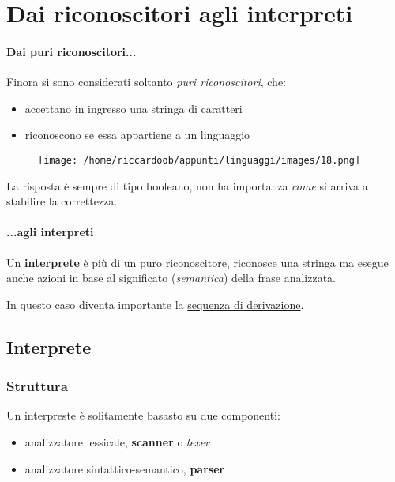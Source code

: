 \chapter{Dai riconoscitori agli interpreti}

\subsubsection{Dai puri riconoscitori...}
Finora si sono considerati soltanto \textit{puri riconoscitori}, che:
\begin{itemize}
    \item accettano in ingresso una stringa di caratteri
    \item riconoscono se essa appartiene a un linguaggio
\end{itemize}

\begin{figure}[H]
    \centering
    \texttt{[image: /home/riccardoob/appunti/linguaggi/images/18.png]}
\end{figure}

La risposta è sempre di tipo booleano, non ha importanza \textit{come} si arriva a stabilire la correttezza.

\subsubsection{...agli interpreti}
Un \textbf{interprete} è più di un puro riconoscitore, riconosce una stringa ma esegue anche azioni in base al significato (\textit{semantica}) della frase analizzata.

In questo caso diventa importante la \underline{sequenza di derivazione}.

\section{Interprete}

\subsection{Struttura}
Un interpreste è solitamente basasto su due componenti:
\begin{itemize}
    \item analizzatore lessicale, \textbf{scanner} o \textit{lexer}
    \item analizzatore sintattico-semantico, \textbf{parser}
\end{itemize}

